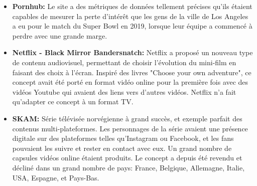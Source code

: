 \begin{itemize}
    \item \textbf{Pornhub:} Le site a des métriques de données tellement précises qu'ils étaient capables de mesurer la perte d'intérêt que les gens de la ville de Los Angeles a eu pour le match du Super Bowl en 2019, lorsque leur équipe a commencé à perdre avec une grande marge.
    \item \textbf{Netflix - Black Mirror Bandersnatch:} Netflix a proposé un nouveau type de contenu audiovisuel, permettant de choisir l'évolution du mini-film en faisant des choix à l'écran. Inspiré des livres "Choose your own adventure", ce concept avait été porté en format vidéo online pour la première fois avec des vidéos Youtube qui avaient des liens vers d'autres vidéos. Netflix n'a fait qu'adapter ce concept à un format TV.
    \item \textbf{SKAM:} Série télévisée norvégienne à grand succès, et exemple parfait des contenus multi-plateformes. Les personnages de la série avaient une présence digitale sur des plateformes telles qu'Instagram ou Facebook, et les fans pouvaient les suivre et rester en contact avec eux. Un grand nombre de capsules vidéos online étaient produits. Le concept a depuis été revendu et décliné dans un grand nombre de pays: France, Belgique, Allemagne, Italie, USA, Espagne, et Pays-Bas.
\end{itemize}
